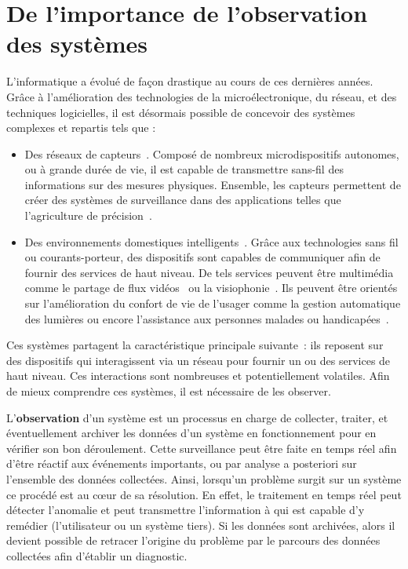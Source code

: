\section{De l'importance de l'observation des systèmes}\label{sec:intro:contexte}
L'informatique a évolué de façon drastique au cours de ces dernières années. Grâce à l'amélioration des technologies de la microélectronique, du réseau, et des techniques logicielles, il est désormais possible de concevoir des systèmes complexes et repartis tels que :
\begin{itemize}
 \item Des réseaux de capteurs~\cite{Akyildiz:wsn,Szewczyk:monitoring}. Composé de nombreux microdispositifs autonomes, ou à grande durée de vie, il est capable de transmettre sans-fil des informations sur des mesures physiques. Ensemble, les capteurs permettent de créer des systèmes de surveillance dans des applications telles que l'agriculture de précision~\cite{Jurdak:sumac}.
 \item Des environnements domestiques intelligents~\cite{Harper:smarthome, Chan:smarthome, Coyle:assisted}. Grâce aux technologies sans fil ou courants-porteur, des dispositifs sont capables de communiquer afin de fournir des services de haut niveau. De tels services peuvent être multimédia comme le partage de flux vidéos~\cite{Kang:upnpav} ou la visiophonie~\cite{Vilei:videophone}. Ils peuvent être orientés sur l'amélioration du confort de vie de l'usager comme la gestion automatique des lumières ou encore l'assistance aux personnes malades ou handicapées~\cite{Korhonen:health}.
\end{itemize}

Ces systèmes partagent la caractéristique principale suivante~: ils reposent sur des dispositifs qui interagissent via un réseau pour fournir un ou des services de haut niveau. Ces interactions sont nombreuses et potentiellement volatiles. Afin de mieux comprendre ces systèmes, il est nécessaire de les observer.

L'\textbf{observation} d'un système est un processus en charge de collecter, traiter, et éventuellement archiver les données d'un système en fonctionnement pour en vérifier son bon déroulement. Cette surveillance peut être faite en temps réel afin d'être réactif aux événements importants, ou par analyse a posteriori sur l'ensemble des données collectées. Ainsi, lorsqu'un problème surgit sur un système ce procédé est au cœur de sa résolution. En effet, le traitement en temps réel peut détecter l'anomalie et peut transmettre l'information à qui est capable d'y remédier (l'utilisateur ou un système tiers). Si les données sont archivées, alors il devient possible de retracer l'origine du problème par le parcours des données collectées afin d'établir un diagnostic.

